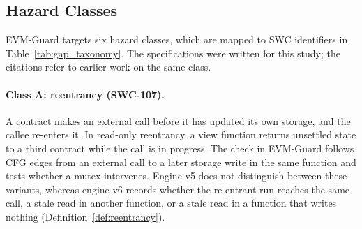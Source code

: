 \documentclass[pdflatex,sn-mathphys]{sn-jnl}
\theoremstyle{thmstyletwo}
\theoremstyle{thmstyletwo}
\begin{document}
\subsection{Hazard Classes}\label{sec:gaps:taxonomy}
EVM-Guard targets six hazard classes, which are mapped to SWC identifiers in Table~\ref{tab:gap_taxonomy}. The specifications were written for this study; the citations refer to earlier work on the same class.

\begin{table}[t]
\centering
\small
\caption{Hazard classes targeted by EVM-Guard and the corresponding specifications (Sections~\ref{sec:math:reentrancy} and~\ref{sec:math:invariants}).}
\label{tab:gap_taxonomy}
\end{table}

\paragraph{Class A: reentrancy (SWC-107).} A contract makes an external call before it has updated its own storage, and the callee re-enters it. In read-only reentrancy, a view function returns unsettled state to a third contract while the call is in progress. The check in EVM-Guard follows CFG edges from an external call to a later storage write in the same function and tests whether a mutex intervenes. Engine v5 does not distinguish between these variants, whereas engine v6 records whether the re-entrant run reaches the same call, a stale read in another function, or a stale read in a function that writes nothing (Definition~\ref{def:reentrancy}).
\end{document}
